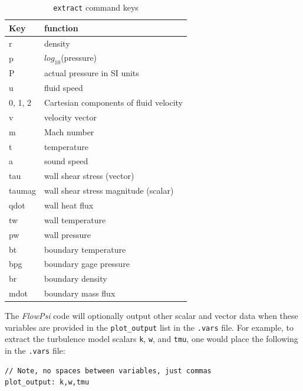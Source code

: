 \documentclass{article}
\begin{document}
\begin{table}[htbp]
  \begin{center}
    \leavevmode
    \begin{tabular}{|l|l|}
      \hline
      Key & function \\
      \hline
      r & density \\
      p & $log_{10}$(pressure) \\
      P & actual pressure in SI units \\
      u & fluid speed \\
      0, 1, 2 & Cartesian components of fluid velocity \\
      v & velocity vector \\
      m & Mach number \\
      t & temperature \\
      a & sound speed \\
      tau & wall shear stress (vector) \\
      taumag & wall shear stress magnitude (scalar)\\
      qdot & wall heat flux \\
      tw & wall temperature \\
      pw & wall pressure \\
      bt & boundary temperature \\
      bpg & boundary gage pressure \\
      br & boundary density \\
      mdot & boundary mass flux \\
      \hline
    \end{tabular}
    
    \caption{{\tt extract} command keys}
    \label{tab:extract}
  \end{center}
\end{table}

The {\em FlowPsi} code will optionally output other scalar and vector data
when these variables are provided in the {\tt plot\_output} list
in the {\tt .vars} file.  
For example, to
extract the turbulence model scalars {\tt k}, {\tt w}, and {\tt tmu},
one would place the following in the {\tt .vars} file:
\begin{verbatim}
// Note, no spaces between variables, just commas
plot_output: k,w,tmu
\end{verbatim}
\end{document}

